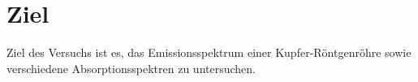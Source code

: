 \section{Ziel}
\label{sec:Ziel}

Ziel des Versuchs ist es, das Emissionsspektrum einer Kupfer-Röntgenröhre sowie verschiedene Absorptionsspektren zu untersuchen.